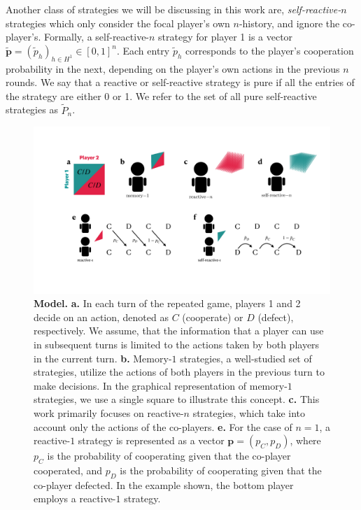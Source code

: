 \documentclass{article}
\theoremstyle{definition}
\begin{document}
Another class of strategies we will be discussing in this work are, {\it
self-reactive-$n$} strategies which only consider the focal player's own
$n$-history, and ignore the co-player's. Formally, a self-reactive-$n$ strategy
for player 1 is a vector $\mathbf{\tilde{p}} = (\tilde{p}_h)_{h \in H^1} \in [0,
1] ^ {n}$. Each entry $\tilde{p}_h$ corresponds to the player's cooperation
probability in the next, depending on the player's own actions in the previous
$n$ rounds. We say that a reactive or self-reactive strategy is pure if all the
entries of the strategy are either 0 or 1. We refer to the set of all pure
self-reactive strategies as $\tilde{P}_n$.

\begin{figure}[h!]
  \centering
  \includegraphics[width=\textwidth]{figures/conceptual_figure_model.pdf}
  \caption{\textbf{Model.}
  \textbf{a.} In each turn of the repeated game, players 1 and 2 decide on an action,
  denoted as $C$ (cooperate) or $D$ (defect), respectively. We assume, that the information that a
  player can use in subsequent turns is limited to the actions taken by both
  players in the current turn.
  \textbf{b.} Memory-$1$ strategies, a well-studied set of strategies, utilize the
  actions of both players in the previous turn to make decisions. In the graphical
  representation of memory-$1$ strategies, we use a single square to illustrate this
  concept.
  \textbf{c.} This work primarily focuses on reactive-$n$ strategies, which take
  into account only the actions of the co-players.
  \textbf{e.} For the case of $n = 1$, a reactive-$1$ strategy is represented as a vector $\mathbf{p} =
  (p_C, p_D)$, where $p_C$ is the probability of cooperating given that the co-player
  cooperated, and $p_D$ is the probability of cooperating given that the co-player
  defected. In the example shown, the bottom player employs a reactive-$1$ strategy.
}
\end{figure}
\end{document}
